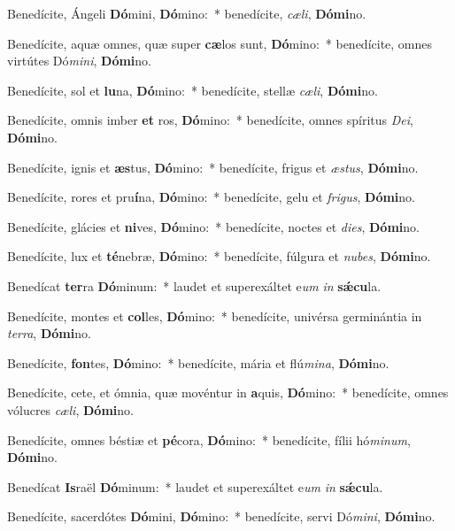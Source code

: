 \item Benedícite, Ángeli \textbf{Dó}mini, \textbf{Dó}mino:~* benedícite, \textit{cæ}\textit{li}, \textbf{Dó}\textbf{mi}no.
\item Benedícite, aquæ omnes, quæ super \textbf{cæ}los sunt, \textbf{Dó}mino:~* benedícite, omnes virtútes Dó\textit{mi}\textit{ni}, \textbf{Dó}\textbf{mi}no.
\item Benedícite, sol et \textbf{lu}na, \textbf{Dó}mino:~* benedícite, stellæ \textit{cæ}\textit{li}, \textbf{Dó}\textbf{mi}no.
\item Benedícite, omnis imber \textbf{et} ros, \textbf{Dó}mino:~* benedícite, omnes spíritus \textit{De}\textit{i}, \textbf{Dó}\textbf{mi}no.
\item Benedícite, ignis et \textbf{æs}tus, \textbf{Dó}mino:~* benedícite, frigus et \textit{æs}\textit{tus}, \textbf{Dó}\textbf{mi}no.
\item Benedícite, rores et pru\textbf{í}na, \textbf{Dó}mino:~* benedícite, gelu et \textit{fri}\textit{gus}, \textbf{Dó}\textbf{mi}no.
\item Benedícite, glácies et \textbf{ni}ves, \textbf{Dó}mino:~* benedícite, noctes et \textit{di}\textit{es}, \textbf{Dó}\textbf{mi}no.
\item Benedícite, lux et \textbf{té}nebræ, \textbf{Dó}mino:~* benedícite, fúlgura et \textit{nu}\textit{bes}, \textbf{Dó}\textbf{mi}no.
\item Benedícat \textbf{ter}ra \textbf{Dó}minum:~* laudet et superexáltet e\textit{um} \textit{in} \textbf{sǽ}\textbf{cu}la.
\item Benedícite, montes et \textbf{col}les, \textbf{Dó}mino:~* benedícite, univérsa germinántia in \textit{ter}\textit{ra}, \textbf{Dó}\textbf{mi}no.
\item Benedícite, \textbf{fon}tes, \textbf{Dó}mino:~* benedícite, mária et flú\textit{mi}\textit{na}, \textbf{Dó}\textbf{mi}no.
\item Benedícite, cete, et ómnia, quæ movéntur in \textbf{a}quis, \textbf{Dó}mino:~* benedícite, omnes vólucres \textit{cæ}\textit{li}, \textbf{Dó}\textbf{mi}no.
\item Benedícite, omnes béstiæ et \textbf{pé}cora, \textbf{Dó}mino:~* benedícite, fílii hó\textit{mi}\textit{num}, \textbf{Dó}\textbf{mi}no.
\item Benedícat \textbf{Is}raël \textbf{Dó}minum:~* laudet et superexáltet e\textit{um} \textit{in} \textbf{sǽ}\textbf{cu}la.
\item Benedícite, sacerdótes \textbf{Dó}mini, \textbf{Dó}mino:~* benedícite, servi Dó\textit{mi}\textit{ni}, \textbf{Dó}\textbf{mi}no.

